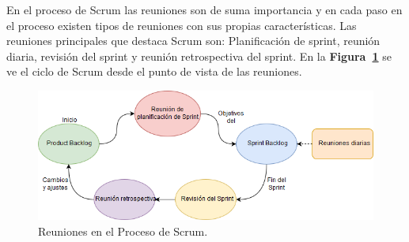 En el proceso de Scrum las reuniones son de suma importancia y en cada paso en el proceso existen tipos de reuniones con sus propias características. Las reuniones principales que destaca Scrum son: Planificación de sprint, reunión diaria, revisión del sprint y reunión retrospectiva del sprint. En la \textbf{Figura~\ref{fig: reunionesScrum}} se ve el ciclo de Scrum desde el punto de vista de las reuniones.

\begin{figure}[ht!]
    \includegraphics[width=\textwidth]{Imagenes/Reuniones_Scrum.jpg}
    \caption{\label{fig: reunionesScrum} Reuniones en el Proceso de Scrum.}
\end{figure}

